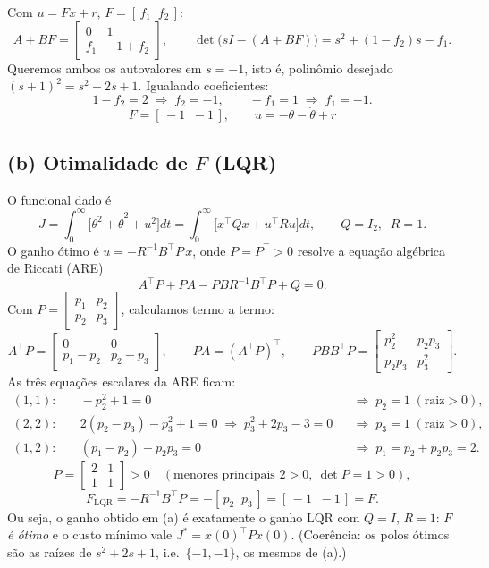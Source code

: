 \documentclass[11pt,a4paper]{article}
\begin{document}
Com $u=Fx+r$, $F=[\,f_1\;\;f_2\,]$:
\[
A+BF=\begin{bmatrix}0&1\\ f_1 & -1+f_2\end{bmatrix},
\qquad
\det\!\big(sI-(A+BF)\big)=s^2+(1-f_2)s-f_1 .
\]
Queremos ambos os autovalores em $s=-1$, isto \'e, polin\^omio desejado
$(s+1)^2=s^2+2s+1$. Igualando coeficientes:
\[
1-f_2=2\;\Rightarrow\;f_2=-1,
\qquad
-f_1=1\;\Rightarrow\;f_1=-1 .
\]
\[
\boxed{\;F=[\,-1\;\;-1\,],\qquad u=-\theta-\dot{\theta}+r\;}
\]

\subsection*{(b) Otimalidade de $F$ (LQR)}

O funcional dado \'e
\[
J=\int_0^\infty\!\Big[\theta^2+\dot{\theta}^2+u^2\Big]dt
 =\int_0^\infty\!\big[x^{\!\top}Qx+u^{\!\top}Ru\big]dt,
\qquad Q=I_2,\;\;R=1 .
\]
O ganho \'otimo \'e $u=-R^{-1}B^{\!\top}P\,x$, onde $P=P^{\!\top}>0$ resolve a
equa\c{c}\~ao alg\'ebrica de Riccati (ARE)
\[
A^{\!\top}P+PA-PBR^{-1}B^{\!\top}P+Q=0 .
\]
Com $P=\begin{bmatrix}p_1&p_2\\p_2&p_3\end{bmatrix}$, calculamos termo a termo:
\[
A^{\!\top}P=\begin{bmatrix}0&0\\ p_1-p_2 & p_2-p_3\end{bmatrix},
\qquad
PA=(A^{\!\top}P)^{\!\top},
\qquad
PBB^{\!\top}P=\begin{bmatrix}p_2^2 & p_2p_3\\ p_2p_3 & p_3^2\end{bmatrix}.
\]
As tr\^es equa\c{c}\~oes escalares da ARE ficam:
\begin{align*}
(1,1):&\quad -p_2^2+1=0 &&\Rightarrow\; p_2=1 \;(\text{raiz}>0),\\
(2,2):&\quad 2(p_2-p_3)-p_3^2+1=0 \;\Rightarrow\; p_3^2+2p_3-3=0 &&\Rightarrow\; p_3=1 \;(\text{raiz}>0),\\
(1,2):&\quad (p_1-p_2)-p_2p_3=0 &&\Rightarrow\; p_1=p_2+p_2p_3=2 .
\end{align*}
\[
P=\begin{bmatrix}2&1\\1&1\end{bmatrix}>0
\quad(\text{menores principais }2>0,\ \det P=1>0),
\]
\[
F_{\mathrm{LQR}}=-R^{-1}B^{\!\top}P=-[\,p_2\;\;p_3\,]=[\,-1\;\;-1\,]=F .
\]
Ou seja, o ganho obtido em (a) \'e exatamente o ganho LQR com $Q=I$, $R=1$:
\emph{$F$ \'e \'otimo} e o custo m\'inimo vale $J^\ast=x(0)^{\!\top}Px(0)$.
(Coer\^encia: os polos \'otimos s\~ao as ra\'izes de $s^2+2s+1$, i.e.\ $\{-1,-1\}$,
os mesmos de (a).)
\end{document}
